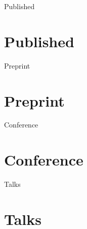 \documentclass[a4paper,12pt]{article}
\title{\myTitle}
\author{\myName}
\date{\small(Updated: \today)}
\newcommand\myBib[1]{
\begin{btSect}{#1}
\section*{#1}
\btPrintAll
\end{btSect}}
\begin{document}
\maketitle



\myBib{Published}
\myBib{Preprint}
\myBib{Conference}
\myBib{Talks}
\end{document}
